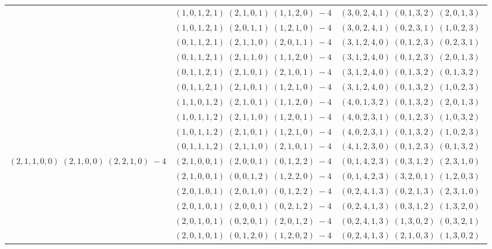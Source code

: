 \documentclass[11pt]{article}
\begin{document}
\begin{longtable}[l]{|c|c|c|}
 \cline{2-3} 
 & $(1 ,0 ,1 ,2 ,1) \;(2 ,1 ,0 ,1) \;(1 ,1 ,2 ,0) \;-4$ & $(3 ,0 ,2 ,4 ,1) \;(0 ,1 ,3 ,2) \;(2 ,0 ,1 ,3) \;$\\ 
 \cline{2-3} 
 & $(1 ,0 ,1 ,2 ,1) \;(2 ,0 ,1 ,1) \;(1 ,2 ,1 ,0) \;-4$ & $(3 ,0 ,2 ,4 ,1) \;(0 ,2 ,3 ,1) \;(1 ,0 ,2 ,3) \;$\\ 
 \cline{2-3} 
 & $(0 ,1 ,1 ,2 ,1) \;(2 ,1 ,1 ,0) \;(2 ,0 ,1 ,1) \;-4$ & $(3 ,1 ,2 ,4 ,0) \;(0 ,1 ,2 ,3) \;(0 ,2 ,3 ,1) \;$\\ 
 \cline{2-3} 
 & $(0 ,1 ,1 ,2 ,1) \;(2 ,1 ,1 ,0) \;(1 ,1 ,2 ,0) \;-4$ & $(3 ,1 ,2 ,4 ,0) \;(0 ,1 ,2 ,3) \;(2 ,0 ,1 ,3) \;$\\ 
 \cline{2-3} 
 & $(0 ,1 ,1 ,2 ,1) \;(2 ,1 ,0 ,1) \;(2 ,1 ,0 ,1) \;-4$ & $(3 ,1 ,2 ,4 ,0) \;(0 ,1 ,3 ,2) \;(0 ,1 ,3 ,2) \;$\\ 
 \cline{2-3} 
 & $(0 ,1 ,1 ,2 ,1) \;(2 ,1 ,0 ,1) \;(1 ,2 ,1 ,0) \;-4$ & $(3 ,1 ,2 ,4 ,0) \;(0 ,1 ,3 ,2) \;(1 ,0 ,2 ,3) \;$\\ 
 \cline{2-3} 
 & $(1 ,1 ,0 ,1 ,2) \;(2 ,1 ,0 ,1) \;(1 ,1 ,2 ,0) \;-4$ & $(4 ,0 ,1 ,3 ,2) \;(0 ,1 ,3 ,2) \;(2 ,0 ,1 ,3) \;$\\ 
 \cline{2-3} 
 & $(1 ,0 ,1 ,1 ,2) \;(2 ,1 ,1 ,0) \;(1 ,2 ,0 ,1) \;-4$ & $(4 ,0 ,2 ,3 ,1) \;(0 ,1 ,2 ,3) \;(1 ,0 ,3 ,2) \;$\\ 
 \cline{2-3} 
 & $(1 ,0 ,1 ,1 ,2) \;(2 ,1 ,0 ,1) \;(1 ,2 ,1 ,0) \;-4$ & $(4 ,0 ,2 ,3 ,1) \;(0 ,1 ,3 ,2) \;(1 ,0 ,2 ,3) \;$\\ 
 \cline{2-3} 
 & $(0 ,1 ,1 ,1 ,2) \;(2 ,1 ,1 ,0) \;(2 ,1 ,0 ,1) \;-4$ & $(4 ,1 ,2 ,3 ,0) \;(0 ,1 ,2 ,3) \;(0 ,1 ,3 ,2) \;$\\ \hline\multirow[t]{38}{*}{ $(2 ,1 ,1 ,0 ,0) \;(2 ,1 ,0 ,0) \;(2 ,2 ,1 ,0) \;-4$ }  & $(2 ,1 ,0 ,0 ,1) \;(2 ,0 ,0 ,1) \;(0 ,1 ,2 ,2) \;-4$ & $(0 ,1 ,4 ,2 ,3) \;(0 ,3 ,1 ,2) \;(2 ,3 ,1 ,0) \;$\\ 
 \cline{2-3} 
 & $(2 ,1 ,0 ,0 ,1) \;(0 ,0 ,1 ,2) \;(1 ,2 ,2 ,0) \;-4$ & $(0 ,1 ,4 ,2 ,3) \;(3 ,2 ,0 ,1) \;(1 ,2 ,0 ,3) \;$\\ 
 \cline{2-3} 
 & $(2 ,0 ,1 ,0 ,1) \;(2 ,0 ,1 ,0) \;(0 ,1 ,2 ,2) \;-4$ & $(0 ,2 ,4 ,1 ,3) \;(0 ,2 ,1 ,3) \;(2 ,3 ,1 ,0) \;$\\ 
 \cline{2-3} 
 & $(2 ,0 ,1 ,0 ,1) \;(2 ,0 ,0 ,1) \;(0 ,2 ,1 ,2) \;-4$ & $(0 ,2 ,4 ,1 ,3) \;(0 ,3 ,1 ,2) \;(1 ,3 ,2 ,0) \;$\\ 
 \cline{2-3} 
 & $(2 ,0 ,1 ,0 ,1) \;(0 ,2 ,0 ,1) \;(2 ,0 ,1 ,2) \;-4$ & $(0 ,2 ,4 ,1 ,3) \;(1 ,3 ,0 ,2) \;(0 ,3 ,2 ,1) \;$\\ 
 \cline{2-3} 
 & $(2 ,0 ,1 ,0 ,1) \;(0 ,1 ,2 ,0) \;(1 ,2 ,0 ,2) \;-4$ & $(0 ,2 ,4 ,1 ,3) \;(2 ,1 ,0 ,3) \;(1 ,3 ,0 ,2) \;$\\ 

\end{longtable}
\end{document}

